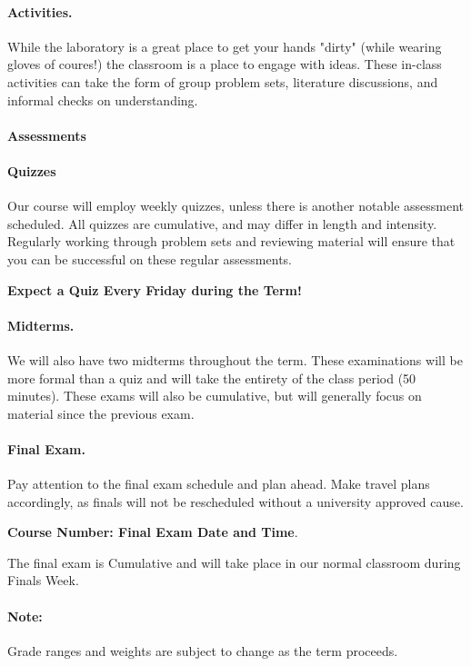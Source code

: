 \documentclass{article}
\begin{document}
\paragraph{Activities.} While the laboratory is a great place to get your hands "dirty" (while wearing gloves of coures!) the classroom is a place to engage with ideas. These in-class activities can take the form of group problem sets, literature discussions, and informal checks on understanding.


\paragraph{Assessments}
\paragraph{Quizzes} Our course will employ weekly quizzes, unless there is another notable assessment scheduled.  All quizzes are cumulative, and may differ in length and intensity.  Regularly working through problem sets and reviewing material will ensure that you can be successful on these regular assessments.

\textbf{Expect a Quiz Every Friday during the Term!}

\paragraph{Midterms.} We will also have two midterms throughout the term.  These examinations will be more formal than a quiz and will take the entirety of the class period (50 minutes).  These exams will also be cumulative, but will generally focus on material since the previous exam.

\paragraph{Final Exam.} Pay attention to the final exam schedule and plan ahead.  Make travel plans accordingly, as finals will not be rescheduled without a university approved cause. 

\textbf{Course Number: Final Exam Date and Time}.  

The final exam is Cumulative and will take place in our normal classroom during Finals Week.

\paragraph{Note:}Grade ranges and weights are subject to change as the term proceeds.
\end{document}
